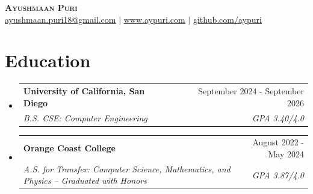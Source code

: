 \documentclass[letterpaper,11pt]{article}
\makeatletter
\newcommand{\resumeSubheading}[4]{
  \vspace{-1pt}\item
    \begin{tabular*}{0.97\textwidth}[t]{l@{\extracolsep{\fill}}r}
      \textbf{#1} & #2 \\
      \textit{\small#3} & \textit{\small #4} \\
    \end{tabular*}\vspace{-4pt}
}
\newcommand{\resumeSubHeadingListStart}{\begin{itemize}[leftmargin=0.15in, label={}]}
\newcommand{\resumeSubHeadingListEnd}{\end{itemize}}
\makeatother
\begin{document}
\begin{center}
    \textbf{\huge \scshape Ayushmaan Puri} \\ \vspace{1pt}
    \href{mailto:ayushmaan.puri18@gmail.com}{\underline{ayushmaan.puri18@gmail.com}} $|$ 
    \href{https://www.aypuri.com}{\underline{www.aypuri.com}} $|$
    \href{https://github.com/aypuri}{\underline{github.com/aypuri}}
\end{center}
\vspace{-25pt}

\section{Education}
  \resumeSubHeadingListStart
    \resumeSubheading
      {University of California, San Diego}{September 2024 - September 2026}
      {B.S. CSE: Computer Engineering}{GPA 3.40/4.0}
    \vspace{2pt}
    \resumeSubheading
      {Orange Coast College}{August 2022 - May 2024}
      {A.S. for Transfer: Computer Science, Mathematics, and Physics -- Graduated with Honors}{GPA 3.87/4.0}
  \resumeSubHeadingListEnd

\end{document}
